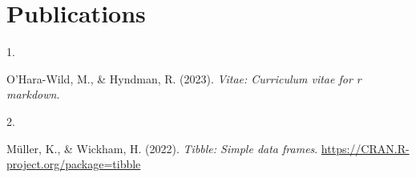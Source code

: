 \documentclass[10pt,a4paper,]{twentysecondcv}
\newlength{\csllabelwidth}
\newcommand{\CSLLeftMargin}[1]{\parbox[t]{\csllabelwidth}{#1}}
\newcommand{\CSLRightInline}[1]{\parbox[t]{\linewidth - \csllabelwidth}{#1}}
\begin{document}
\hypertarget{publications}{%
\section{Publications}\label{publications}}

\hypertarget{bibliography}{}
\leavevmode{}%
\CSLLeftMargin{1. }%
\CSLRightInline{O'Hara-Wild, M., \& Hyndman, R. (2023). \emph{Vitae:
Curriculum vitae for r markdown}.}

\leavevmode{}%
\CSLLeftMargin{2. }%
\CSLRightInline{Müller, K., \& Wickham, H. (2022). \emph{Tibble: Simple
data frames}. \url{https://CRAN.R-project.org/package=tibble}}
\end{document}
